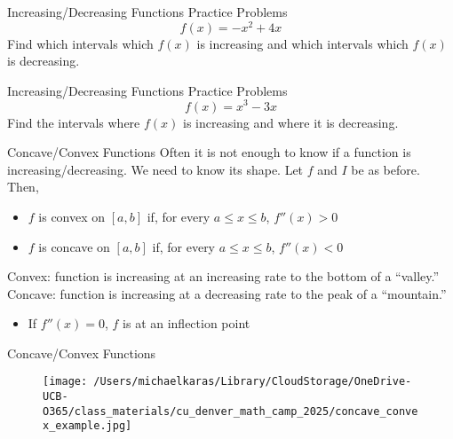 \documentclass[aspectratio=169]{beamer}
\begin{document}
\begin{frame}{Increasing/Decreasing Functions Practice Problems}\label{main1}
	\vspace{-4cm}
     \[
    f(x) = -x^2 + 4x
    \]
    Find which intervals which \( f(x) \) is increasing and which intervals which \( f(x) \) is decreasing.
\end{frame}

\begin{frame}{Increasing/Decreasing Functions Practice Problems}\label{main2}
    \vspace{-4cm}
    \[
    f(x) = x^3 - 3x
    \]
    Find the intervals where \( f(x) \) is increasing and where it is decreasing.
\end{frame}

\begin{frame}{Concave/Convex Functions}\label{main1}
    Often it is not enough to know if a function is increasing/decreasing. We need to know its shape. Let $f$ and $I$ be as before. Then,
    \begin{itemize}
        \item $f$ is convex on $[a, b]$ if, for every $a \leq x \leq b$, $f''(x) > 0$
        \item $f$ is concave on $[a, b]$ if, for every $a \leq x \leq b$, $f''(x) < 0$
    \end{itemize}
    Convex: function is increasing at an increasing rate to the bottom of a “valley.” Concave: function is increasing at a decreasing rate to the peak of a “mountain.”
    \begin{itemize}
        \item If $f''(x) = 0$, $f$ is at an inflection point
    \end{itemize}
\end{frame}

\begin{frame}{Concave/Convex Functions}\label{main1}
    \begin{figure}
        \centering
        \texttt{[image: /Users/michaelkaras/Library/CloudStorage/OneDrive-UCB-O365/class\_materials/cu\_denver\_math\_camp\_2025/concave\_convex\_example.jpg]}
    \end{figure}
\end{frame}
\end{document}
